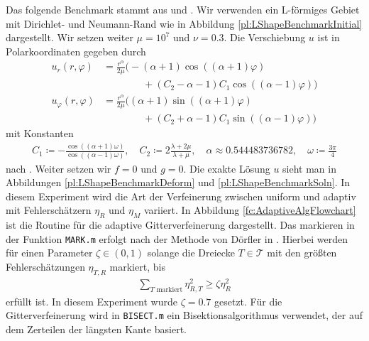 \documentclass{scrartcl}
\newcommand{\cT}{\mathcal{T}}
\begin{document}
Das folgende Benchmark stammt aus \cite[Abschnitt 3.4]{Car-2011} und \cite[S.255f.]{Alb-2002}.
Wir verwenden ein L-förmiges Gebiet mit Dirichlet- und Neumann-Rand wie in Abbildung \ref{pl:LShapeBenchmarkInitial} dargestellt.
Wir setzen weiter $\mu=10^7$ und $\nu=0.3$. Die Verschiebung $u$ ist
in Polarkoordinaten gegeben durch
\begin{align*}
	u_r(r,\varphi) &= \frac{r^\alpha}{2\mu}\big(-(\alpha+1)\cos\left((\alpha+1)\varphi\right) \\
	&\qquad\qquad+(C_2-\alpha-1)C_1\cos\left((\alpha-1)\varphi\right)\big) \\
	u_\varphi(r,\varphi) &= \frac{r^\alpha}{2\mu}\big((\alpha+1)\sin\left((\alpha+1)\varphi\right) \\
	&\qquad\qquad+(C_2+\alpha-1)C_1\sin\left((\alpha-1)\varphi\right)\big)
\end{align*}
mit Konstanten
\begin{align*}
	C_1\coloneqq -\frac{\cos((\alpha+1)\omega)}{\cos((\alpha-1)\omega)},
	\quad C_2\coloneqq2\frac{\lambda+2\mu}{\lambda+\mu},
	\quad\alpha\approx 0.544483736782,
	\quad\omega\coloneqq\frac{3\pi}{4}
\end{align*}
nach \cite[Abschnitt 3.4]{Car-2011}.
Weiter setzen wir $f = 0$ und $g=0$.
Die exakte Lösung $u$ sieht man in Abbildungen \ref{pl:LShapeBenchmarkDeform} und \ref{pl:LShapeBenchmarkSoln}. 
In diesem Experiment wird die Art der Verfeinerung zwischen uniform und adaptiv mit Fehlerschätzern $\eta_R$ und $\eta_M$ variiert.
In Abbildung \ref{fc:AdaptiveAlgFlowchart} ist die Routine für die adaptive Gitterverfeinerung dargestellt.
Das markieren in der Funktion \texttt{MARK.m} erfolgt nach der Methode von Dörfler in \cite{Doe-1996}. Hierbei werden für einen Parameter $\zeta\in(0,1)$ solange die Dreiecke $T\in\cT$ mit den größten Fehlerschätzungen $\eta_{T,R}$ markiert, bis
\begin{align*}
	\sum_{T\text{ markiert}}\eta_{R,T}^2\geq\zeta\eta_R^2
\end{align*}
erfüllt ist. In diesem Experiment wurde $\zeta=0.7$ gesetzt. Für die Gitterverfeinerung wird in \texttt{BISECT.m} ein Bisektionsalgorithmus verwendet, der auf dem Zerteilen der längsten Kante basiert.
\end{document}
